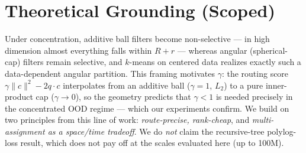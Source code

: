 \documentclass{article}
\begin{document}
\begin{table}[t]
\centering
\caption{Components of the pipeline: standard building blocks vs.\ this work.}
\label{tab:oldnew}
\end{table}

\section{Theoretical Grounding (Scoped)}
\label{sec:theory}
Under concentration, additive ball filters become non-selective --- in high
dimension almost everything falls within $R+r$ --- whereas angular (spherical-cap)
filters remain selective, and $k$-means on centered data realizes exactly such a
data-dependent angular partition. This framing motivates $\gamma$: the routing score
$\gamma\lVert c\rVert^2-2q\cdot c$ interpolates from an additive ball ($\gamma{=}1$,
$L_2$) to a pure inner-product cap ($\gamma{\to}0$), so the geometry predicts that
$\gamma{<}1$ is needed precisely in the concentrated OOD regime --- which our
experiments confirm. We build on two principles from this line of work:
\emph{route-precise, rank-cheap}, and \emph{multi-assignment as a space/time
tradeoff}. We do \emph{not} claim the recursive-tree polylog-loss result, which does
not pay off at the scales evaluated here (up to 100M).
\end{document}

